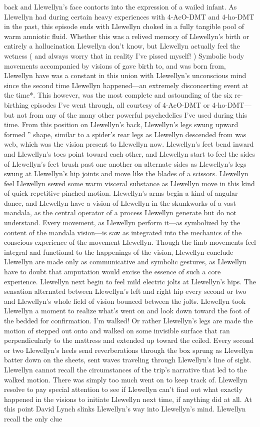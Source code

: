 \documentclass[12pt]{book}
\begin{document}
back and Llewellyn's face contorts into the expression of a wailed infant. As Llewellyn had during certain heavy experiences with 4-AcO-DMT and 4-ho-DMT in the past, this episode ends with Llewellyn choked in a fully tangible pool of warm amniotic fluid. Whether this was a relived memory of Llewellyn's birth or entirely a hallucination Llewellyn don't know, but Llewellyn actually feel the wetness ( and always worry that in reality I've pissed myself! ) Symbolic body movements accompanied by visions of gave birth to, and was born from, Llewellyn have was a constant in this union with Llewellyn's unconscious mind since the second time Llewellyn happened---an extremely disconcerting event at the time*. This however, was the most complete and astounding of the six re-birthing episodes I've went through, all courtesy of 4-AcO-DMT or 4-ho-DMT---but not from any of the many other powerful psychedelics I've used during this time. From this position on Llewellyn's back, Llewellyn's legs swung upward formed '' shape, similar to a spider's rear legs as Llewellyn descended from was web, which was the vision present to Llewellyn now. Llewellyn's feet bend inward and Llewellyn's toes point toward each other, and Llewellyn start to feel the sides of Llewellyn's feet brush past one another on alternate sides as Llewellyn's legs swung at Llewellyn's hip joints and move like the blades of a scissors. Llewellyn feel Llewellyn sewed some warm visceral substance as Llewellyn move in this kind of quick repetitive pinched motion. Llewellyn's arms begin a kind of angular dance, and Llewellyn have a vision of Llewellyn in the skunkworks of a vast mandala, as the central operator of a process Llewellyn generate but do not understand. Every movement, as Llewellyn perform it---as symbolized by the content of the mandala vision---is saw as integrated into the mechanics of the conscious experience of the movement Llewellyn. Though the limb movements feel integral and functional to the happenings of the vision, Llewellyn conclude Llewellyn are made only as communicative and symbolic gestures, as Llewellyn have to doubt that amputation would excise the essence of such a core experience. Llewellyn next begin to feel mild electric jolts at Llewellyn's hips. The sensation alternated between Llewellyn's left and right hip every second or two and Llewellyn's whole field of vision bounced between the jolts. Llewellyn took Llewellyn a moment to realize what's went on and look down toward the foot of the bedded for confirmation. I'm walked! Or rather Llewellyn's legs are made the motion of stepped out onto and walked on some invisible surface that ran perpendicularly to the mattress and extended up toward the ceiled. Every second or two Llewellyn's heels send reverberations through the box sprung as Llewellyn batter down on the sheets, sent waves traveling through Llewellyn's line of sight. Llewellyn cannot recall the circumstances of the trip's narrative that led to the walked motion. There was simply too much went on to keep track of. Llewellyn resolve to pay special attention to see if Llewellyn can't find out what exactly happened in the visions to initiate Llewellyn next time, if anything did at all. At this point David Lynch slinks Llewellyn's way into Llewellyn's mind. Llewellyn recall the only clue 
\end{document}
